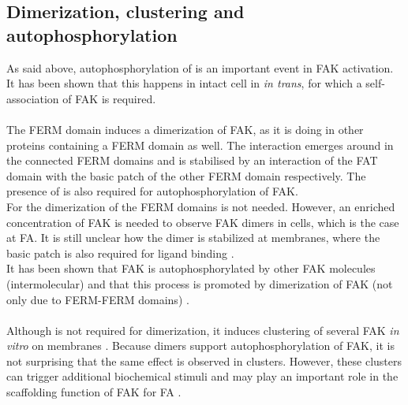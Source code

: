 \subsection{Dimerization, clustering and autophosphorylation}
\label{intro:clustering}
As said above, autophosphorylation of  is an important event in FAK activation. It has been shown that this happens in intact cell in \textit{in trans}, for which a self-association of FAK is required.\\
\\
The FERM domain induces a dimerization of FAK, as it is doing in other proteins containing a FERM domain as well. The interaction emerges around  in the connected FERM domains and is stabilised by an interaction of the FAT domain with the basic patch of the other FERM domain respectively. The presence of  is also required for autophosphorylation of FAK.\\
For the dimerization of the FERM domains \pip{} is not needed. However, an enriched concentration of FAK is needed to observe FAK dimers in cells, which is the case at FA. It is still unclear how the dimer is stabilized at membranes, where the basic patch is also required for ligand binding \autocite{fakdimers}.\\
It has been shown that FAK is autophosphorylated by other FAK molecules (intermolecular) and that this process is promoted by dimerization of FAK (not only due to FERM-FERM domains) \autocite{dimersVsClusters}.\\
\\
Although \pip{} is not required for dimerization, it induces clustering of several FAK \textit{in vitro} on membranes \autocite{pap001}. Because dimers support autophosphorylation of FAK, it is not surprising that the same effect is observed in clusters. However, these clusters can trigger additional biochemical stimuli \autocite{dimersVsClusters} and may play an important role in the scaffolding function of FAK for FA \autocite{pap001}.
